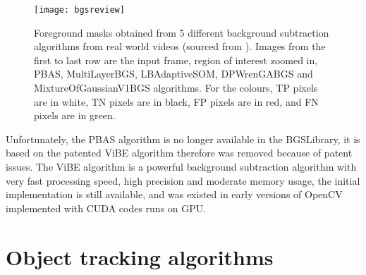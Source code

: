 \begin{figure}[tbh]
  \centering
  \texttt{[image: bgsreview]}
  \caption{Foreground masks obtained from 5 different background subtraction algorithms from real world videos (sourced from \cite{bgs:article}). Images from the first to last row are the input frame, region of interest zoomed in, PBAS, MultiLayerBGS, LBAdaptiveSOM, DPWrenGABGS and MixtureOfGaussianV1BGS algorithms. For the colours, TP pixels are in white, TN pixels are in black, FP pixels are in red, and FN pixels are in green.}
  \label{bgsreview}
\end{figure}

Unfortunately, the PBAS algorithm is no longer available in the BGSLibrary, it is based on the patented ViBE algorithm \cite{barnich2011vibe} therefore was removed because of patent issues. The ViBE algorithm is a powerful background subtraction algorithm with very fast processing speed, high precision and moderate memory usage, the initial implementation is still available, and was existed in early versions of OpenCV implemented with CUDA codes runs on GPU.

\iffalse
\subsection{Optical flow}

Optical flow is another widely used object tracking algorithm, it can be used for detect moving objects as well.

There are 2 types of optical flow algorithms. One is sparse feature set (Lucas-Kanade method \cite{bouguet2001pyramidal}), it evaluates pixel movements around selected feature points, therefore calculates movements of feature points. Another type is dense optical flow (Gunner Farneback's algorithm \cite{farneback2003two}), it evaluates pixel movements for all pixels in the frame.

{\color{red}More descriptions and images?}

By rendering pixel movements in 3 axes computed from dense optical flow as 3 components (RGB) colours, then find out regions with the same colour, sizes and positions of moving objects in the scene can then be determined. However, once an object stopped moving, the optical flow algorithms cannot distinguish the object from background any longer.
\fi

\section{Object tracking algorithms}
\label{bg:tracking}

